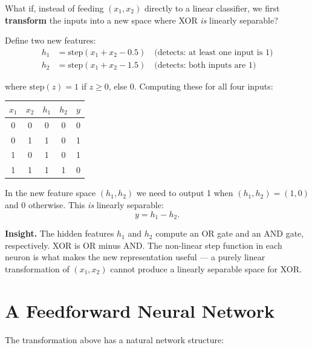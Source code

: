 \documentclass[12pt, a4paper]{article}
\theoremstyle{definition}
\begin{document}
What if, instead of feeding $(x_1, x_2)$ directly to a linear classifier,
we first \textbf{transform} the inputs into a new space where XOR
\emph{is} linearly separable?

Define two new features:
\begin{align*}
  h_1 &= \text{step}(x_1 + x_2 - 0.5)
         \quad\text{(detects: at least one input is 1)} \\
  h_2 &= \text{step}(x_1 + x_2 - 1.5)
         \quad\text{(detects: both inputs are 1)}
\end{align*}

where $\text{step}(z) = 1$ if $z \ge 0$, else $0$.  Computing these for all
four inputs:

\begin{center}
\renewcommand{\arraystretch}{1.2}
\begin{tabular}{cc|cc|c}
\toprule
$x_1$ & $x_2$ & $h_1$ & $h_2$ & $y$ \\
\midrule
0 & 0 & 0 & 0 & 0 \\
0 & 1 & 1 & 0 & 1 \\
1 & 0 & 1 & 0 & 1 \\
1 & 1 & 1 & 1 & 0 \\
\bottomrule
\end{tabular}
\end{center}

In the new feature space $(h_1, h_2)$ we need to output 1 when $(h_1, h_2)
= (1, 0)$ and 0 otherwise.  This \emph{is} linearly separable:
\[
  y = h_1 - h_2.
\]

\begin{notebox}
\textbf{Insight.}
The hidden features $h_1$ and $h_2$ compute an OR gate and an AND gate,
respectively.  XOR is OR minus AND.  The non-linear step function in each
neuron is what makes the new representation useful — a purely linear
transformation of $(x_1, x_2)$ cannot produce a linearly separable space
for XOR.
\end{notebox}

\section{A Feedforward Neural Network}

The transformation above has a natural network structure:
\end{document}
